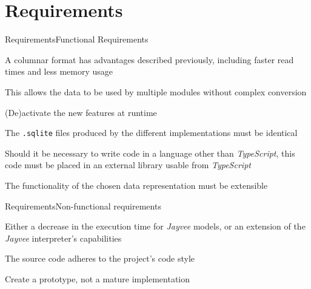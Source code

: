 \section{Requirements}
\begin{frame}[t]{Requirements}{Functional Requirements}
	\begin{description}[<+(1)->]
		\item[columnar] A columnar format has advantages described previously, including faster read times and less memory usage
		\item[interoperability] This allows the data to be used by multiple modules without complex conversion
		\item[feature toggle] (De)activate the new features at runtime
		\item[compatibility] The \Verb|.sqlite| files produced by the different implementations must be identical
		\item[modularization] Should it be necessary to write code in a language other than \emph{TypeScript}, this code must be placed in an external library usable from \emph{TypeScript}
		\item[extensibility] The functionality of the chosen data representation must be extensible
	\end{description}
\end{frame}
\begin{frame}[t]{Requirements}{Non-functional requirements}
	\begin{description}[<+(1)->]
		\item[performance] Either a decrease in the execution time for \emph{Jayvee} models, or an extension of the \emph{Jayvee} interpreter's capabilities
		\item[code style] The source code adheres to the project's code style
		\item[maturity] Create a prototype, not a mature implementation
	\end{description}
\end{frame}

